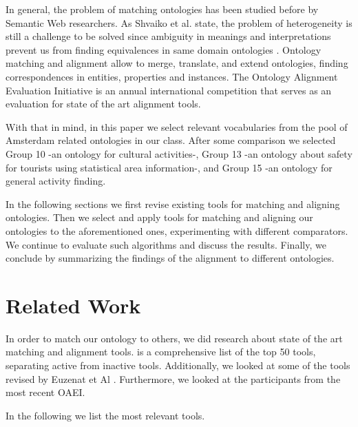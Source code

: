 \documentclass[runningheads,a4paper]{../../StyleFiles/llncs}
\begin{document}
In general, the problem of matching ontologies has been studied before by Semantic Web researchers. As Shvaiko et al. state, the problem of heterogeneity is still a challenge to be solved since ambiguity in meanings and interpretations prevent us from finding equivalences in same domain ontologies \cite{shvaiko2013ontology}. Ontology matching and alignment allow to merge, translate, and extend ontologies, finding correspondences in entities, properties and instances. The Ontology Alignment Evaluation Initiative is an annual international competition that serves as an evaluation for state of the art alignment tools. 

With that in mind, in this paper we select relevant vocabularies from the pool of Amsterdam related ontologies in our class. After some comparison we selected Group 10 -an ontology for cultural activities-, Group 13 -an ontology about safety for tourists using statistical area information-, and Group 15 -an ontology for general activity finding.

In the following sections we first revise existing tools for matching and aligning ontologies. Then we select and apply tools for matching and aligning our ontologies to the aforementioned ones, experimenting with different comparators. We continue to evaluate such algorithms and discuss the results. Finally, we conclude by summarizing the findings of the alignment to different ontologies.

\section{Related Work}
\label{related_work}
In order to match our ontology to others, we did research about state of the art matching and alignment tools. \cite{adaptiveInformation_2014} is a comprehensive list of the top 50 tools, separating active from inactive tools. Additionally, we looked at some of the tools revised by Euzenat et Al \cite{euzenat2007ontology}. Furthermore, we looked at the participants from the most recent OAEI.

In the following we list the most relevant tools.
\end{document}
